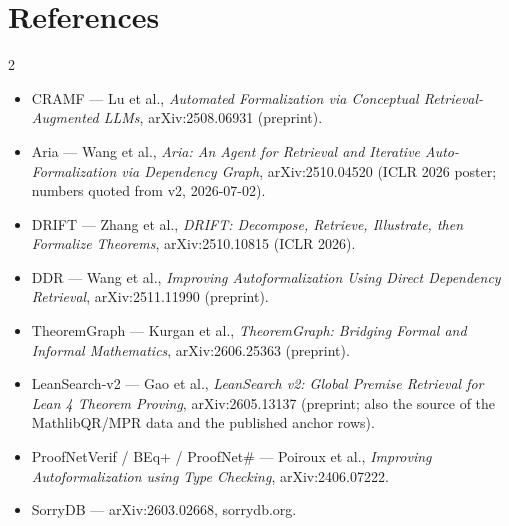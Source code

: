 \documentclass[10pt]{article}
\begin{document}
\section*{References}

\begingroup\footnotesize
\begin{multicols}{2}
\begin{itemize}[leftmargin=1.2em,itemsep=1pt]
\item CRAMF --- Lu et al., \emph{Automated Formalization via Conceptual
  Retrieval-Augmented LLMs}, arXiv:2508.06931 (preprint).
\item Aria --- Wang et al., \emph{Aria: An Agent for Retrieval and
  Iterative Auto-Formalization via Dependency Graph}, arXiv:2510.04520
  (ICLR 2026 poster; numbers quoted from v2, 2026-07-02).
\item DRIFT --- Zhang et al., \emph{DRIFT: Decompose, Retrieve,
  Illustrate, then Formalize Theorems}, arXiv:2510.10815 (ICLR 2026).
\item DDR --- Wang et al., \emph{Improving Autoformalization Using
  Direct Dependency Retrieval}, arXiv:2511.11990 (preprint).
\item TheoremGraph --- Kurgan et al., \emph{TheoremGraph: Bridging
  Formal and Informal Mathematics}, arXiv:2606.25363 (preprint).
\item LeanSearch-v2 --- Gao et al., \emph{LeanSearch v2: Global Premise
  Retrieval for Lean 4 Theorem Proving}, arXiv:2605.13137 (preprint;
  also the source of the MathlibQR/MPR data and the published anchor
  rows).
\item ProofNetVerif / BEq+ / ProofNet\# --- Poiroux et al.,
  \emph{Improving Autoformalization using Type Checking},
  arXiv:2406.07222.
\item SorryDB --- arXiv:2603.02668, sorrydb.org.
\end{itemize}
\end{multicols}
\endgroup
\end{document}
